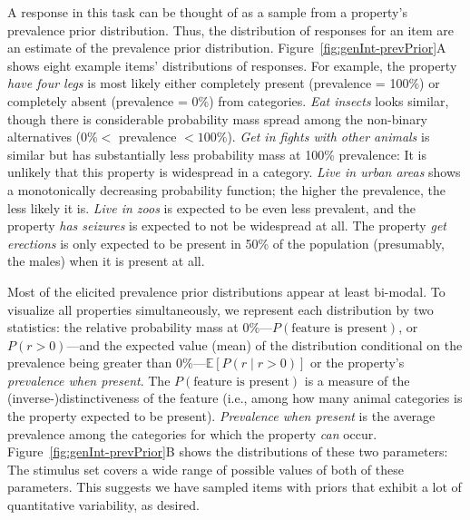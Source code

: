 \documentclass[floatsintext,doc]{apa6}
\begin{document}
A response in this task can be thought of as a sample from a property's prevalence prior distribution.
Thus, the distribution of responses for an item are an estimate of the prevalence prior distribution.
Figure~\ref{fig:genInt-prevPrior}A shows eight example items' distributions of responses.
For example, the property \emph{have four legs} is most likely either completely present (prevalence = 100\%) or completely absent (prevalence = 0\%) from categories.
\emph{Eat insects} looks similar, though there is considerable probability mass spread among the non-binary alternatives (\(0\% <\) prevalence \(< 100\%\)).
\emph{Get in fights with other animals} is similar but has substantially less probability mass at 100\% prevalence: It is unlikely that this property is widespread in a category.
\emph{Live in urban areas} shows a monotonically decreasing probability function; the higher the prevalence, the less likely it is.
\emph{Live in zoos} is expected to be even less prevalent, and the property \emph{has seizures} is expected to not be widespread at all.
The property \emph{get erections} is only expected to be present in 50\% of the population (presumably, the males) when it is present at all.

Most of the elicited prevalence prior distributions appear at least bi-modal.
To visualize all properties simultaneously, we represent each distribution by two statistics: the relative probability mass at 0\%---\(P(\text{feature is present})\), or \(P(r > 0)\)---and the expected value (mean) of the distribution conditional on the prevalence being greater than 0\%---\(\mathbb{E}[P(r \mid r>0)]\) or the property's \emph{prevalence when present}.
The $P(\text{feature is present})$ is a measure of the (inverse-)distinctiveness of the feature (i.e., among how many animal categories is the property expected to be present). 
\emph{Prevalence when present} is the average prevalence among the categories for which the property \emph{can} occur. 
Figure~\ref{fig:genInt-prevPrior}B shows the distributions of these two parameters: The stimulus set covers a wide range of possible values of both of these parameters.
This suggests we have sampled items with priors that exhibit a lot of quantitative variability, as desired.
\end{document}
